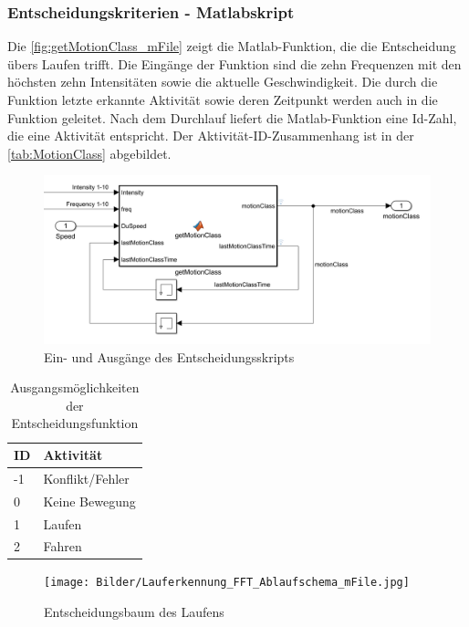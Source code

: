 \subsubsection{Entscheidungskriterien - Matlabskript}
%
%
%
%
%
Die \autoref{fig:getMotionClass_mFile} zeigt die Matlab-Funktion, die die Entscheidung übers Laufen trifft. Die Eingänge der Funktion sind die zehn Frequenzen mit den höchsten zehn Intensitäten sowie die aktuelle Geschwindigkeit. Die durch die Funktion letzte erkannte Aktivität sowie deren Zeitpunkt werden auch in die Funktion geleitet. Nach dem Durchlauf liefert die Matlab-Funktion eine Id-Zahl, die eine Aktivität entspricht. Der Aktivität-ID-Zusammenhang ist in der \autoref{tab:MotionClass} abgebildet.

\begin{figure}[H]
	\centering
	\includegraphics[width=\linewidth]{Bilder/getMotionClass_mFile.png}
	\caption{Ein- und Ausgänge des Entscheidungsskripts}
	\label{fig:getMotionClass_mFile}
\end{figure}

\begin{table}[H]
	\caption{Ausgangsmöglichkeiten der Entscheidungsfunktion} 
	\centering
	\begin{tabular}{|l|l|}%
			\hline
			\textbf{ID} & \textbf{Aktivität} \\
			\hline
			-1 & Konflikt/Fehler \\
			\hline
			0 & Keine Bewegung \\
			\hline
			1 & Laufen \\
			\hline
			2 & Fahren \\
			\hline
		\end{tabular}
	\label{tab:MotionClass}
\end{table}

\begin{figure}[H]
	\centering
	\texttt{[image: Bilder/Lauferkennung\_FFT\_Ablaufschema\_mFile.jpg]}
	\caption{Entscheidungsbaum des Laufens}
	\label{fig:Lauferkennung_FFT_Entscheidungsbaum_mFile}
\end{figure}

